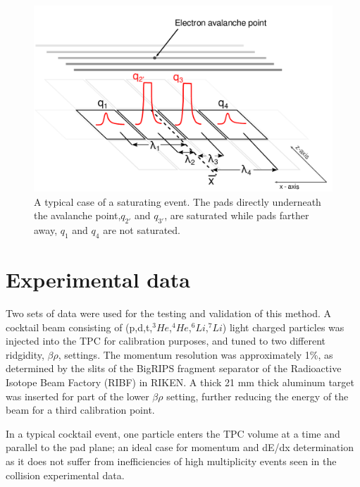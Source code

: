 \documentclass[review]{elsarticle}
\begin{document}

\begin{figure}[H]
\includegraphics[width=\linewidth]{saturated_pads}
\caption{A typical case of a saturating event. The pads directly underneath the avalanche point,$q_{2'}$ and $q_{3'}$, are saturated while pads farther away, $q_1$ and $q_4$ are not saturated.}
\label{fig:satpad}
\end{figure}

\section{Experimental data}
Two sets of data were used for the testing and validation of this method. A cocktail beam consisting of (p,d,t,${}^3He$,${}^4He$,${}^6Li$,${}^7Li$) light charged particles was injected into the TPC for calibration purposes, and tuned to two different ridgidity, $\beta\rho$, settings. The momentum resolution was approximately 1\%, as determined by the slits of the BigRIPS fragment separator of the Radioactive Isotope Beam Factory (RIBF) in RIKEN. A thick 21 mm thick aluminum target was inserted for part of the lower $\beta\rho$ setting, further reducing the energy of the beam for a third calibration point. 

In a typical cocktail event, one particle enters the TPC volume at a time and parallel to the pad plane; an ideal case for momentum and dE/dx determination as it does not suffer from inefficiencies of high multiplicity events seen in the collision experimental data.  
\end{document}
